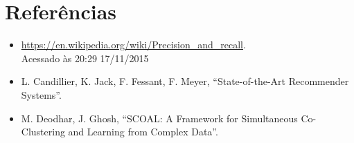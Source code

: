 \section{Referências}

\begin{itemize}
  \item \url{https://en.wikipedia.org/wiki/Precision_and_recall}. \\
  		Acessado às 20:29 17/11/2015

  \item L. Candillier, K. Jack, F. Fessant, F. Meyer, ``State-of-the-Art
Recommender Systems''.

  \item   M. Deodhar, J. Ghosh, ``SCOAL: A Framework for Simultaneous
Co-Clustering and Learning from Complex Data''.

\end{itemize}